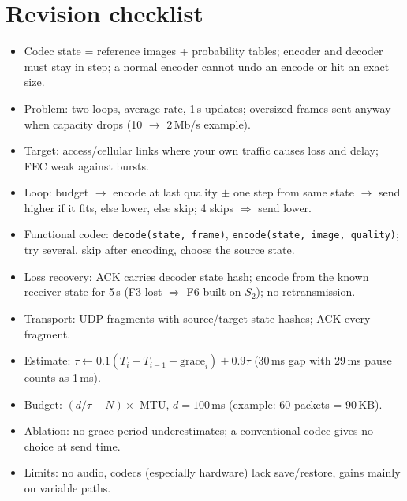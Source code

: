 \section{Revision checklist}
\begin{itemize}
  \item Codec state = reference images + probability tables; encoder and decoder must stay in step; a normal encoder cannot undo an encode or hit an exact size.
  \item Problem: two loops, average rate, 1\,s updates; oversized frames sent anyway when capacity drops (10 $\to$ 2\,Mb/s example).
  \item Target: access/cellular links where your own traffic causes loss and delay; FEC weak against bursts.
  \item Loop: budget $\to$ encode at last quality $\pm$ one step from same state $\to$ send higher if it fits, else lower, else skip; 4 skips $\Rightarrow$ send lower.
  \item Functional codec: \texttt{decode(state, frame)}, \texttt{encode(state, image, quality)}; try several, skip after encoding, choose the source state.
  \item Loss recovery: ACK carries decoder state hash; encode from the known receiver state for 5\,s (F3 lost $\Rightarrow$ F6 built on $S_2$); no retransmission.
  \item Transport: UDP fragments with source/target state hashes; ACK every fragment.
  \item Estimate: $\tau \leftarrow 0.1(T_i - T_{i-1} - \text{grace}_i) + 0.9\tau$ (30\,ms gap with 29\,ms pause counts as 1\,ms).
  \item Budget: $(d/\tau - N) \times$ MTU, $d = 100$\,ms (example: 60 packets = 90\,KB).
  \item Ablation: no grace period underestimates; a conventional codec gives no choice at send time.
  \item Limits: no audio, codecs (especially hardware) lack save/restore, gains mainly on variable paths.
\end{itemize}
